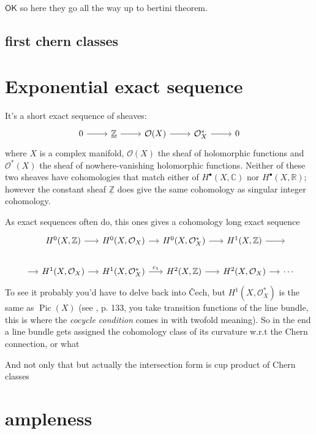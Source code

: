 \(\mathsf{OK}\) so here they go all the way up to bertini theorem.

\subsection{first chern classes}


\section{Exponential exact sequence}

It's a short exact sequence of sheaves:
\[\begin{tikzcd}0\arrow[r]&\underline{\mathbb{Z}}\arrow[r]&\mathcal{O}(X)\arrow[r]&\mathcal{O}^*_X\arrow[r]&0\end{tikzcd}\]
where \(X\) is a complex manifold, \(\mathcal{O}(X)\) the sheaf of holomorphic functions and \(\mathcal{O} ^*(X)\) the sheaf of nowhere-vanishing holomorphic functions. Neither of these two sheaves have cohomologies that match either of \(H^{\bullet}(X,\mathbb{C})\) nor \(H^{\bullet}(X,\mathbb{R})\); however the constant sheaf \(\underline{\mathbb{Z}}\) does give the same cohomology as singular integer cohomology.

As exact sequences often do, this ones gives a cohomology long exact sequence
\[\begin{tikzcd}[column sep=small]
	\leavevmode&H^{0}(X,\mathbb{Z})\arrow[r]&H^{0}(X,\mathcal{O}_X)\arrow[r]&H^{0}(X,\mathcal{O}_X^*)\arrow[r]&H^{1}(X,\mathbb{Z})\arrow[r]& \leavevmode\\
	\arrow[r]&H^{1}(X,\mathcal{O}_X)\arrow[r]&H^{1}(X,\mathcal{O}_X^*)\arrow[r,"c_1"]&H^{2}(X,\mathbb{Z})\arrow[r]&H^{2}(X,\mathcal{O}_X)\arrow[r]&\cdots
\end{tikzcd}\]
To see it probably you'd have to delve back into \v Cech, but \(H^{1}(X,\mathcal{O}_X^*)\) is the same as \(\operatorname{Pic}(X)\) (see \cite{gri}, p. 133, you take transition functions of the line bundle, this is where the \textit{cocycle condition} comes in with twofold meaning). So in the end a line bundle gets assigned the cohomology class of its curvature w.r.t the Chern connection, or what

And not only that but actually the intersection form is cup product of Chern classes



\section{ampleness}
